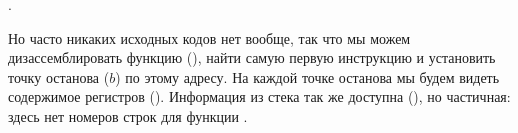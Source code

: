 .




Но часто никаких исходных кодов нет вообще, так что мы можем дизассемблировать функцию \comp (), 
найти самую первую инструкцию \CMP и установить точку останова ($b$) по этому адресу.
На каждой точке останова мы будем видеть содержимое регистров ().
Информация из стека так же доступна (), 
но частичная: здесь нет номеров строк для функции \comp.



